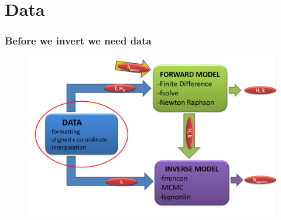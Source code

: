 \documentclass[7pt]{beamer}
\begin{document}
    \section{Data}

    \begin{frame}
      \frametitle{Before we invert we need data}
      \begin{figure}[flowchart]
        \includegraphics[width=1.0\linewidth]{img/Focus_D.png}
      \end{figure}
    \end{frame}
\end{document}
